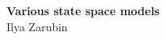 
\begin{titlepage}

\thispagestyle{empty}   %


\begin{center}
\vspace*{2.cm}
{\textbf{\large{Various state space models}}} \\
\vspace*{2cm}
Ilya Zarubin\\

\end{center}


\vfill
\begin{flushright}
   \vspace*{0.5cm}
\end{flushright}


\end{titlepage}

\clearpage                %




\clearpage
\clearpage

%
%
%
%
%
\setcounter{page}{1}        %
%
%
%
%
%
\clearpage